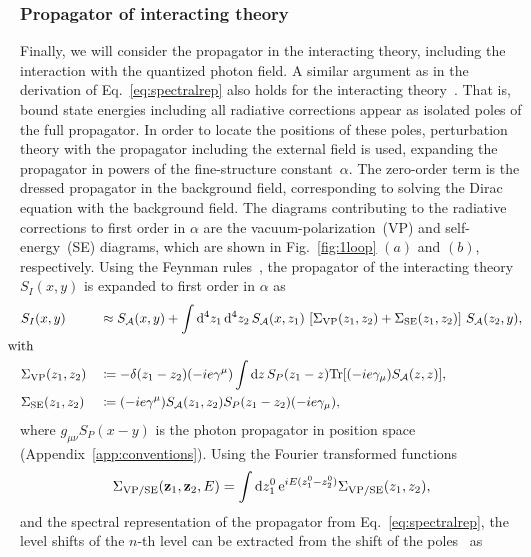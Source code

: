 \subsubsection*{Propagator of interacting theory}
Finally, we will consider the propagator in the interacting theory, including the interaction with the quantized photon field. A similar argument as in the derivation of Eq.~\eqref{eq:spectralrep} also holds for the interacting theory~\cite[Section 14.2.]{weinberg2005}. That is, bound state energies including all radiative corrections appear as isolated poles of the full propagator. In order to locate the positions of these poles, perturbation theory with the propagator including the external field is used, expanding the propagator in powers of the fine-structure constant~$\alpha$. The zero-order term is the dressed propagator in the background field, corresponding to solving the Dirac equation with the background field. The diagrams contributing to the radiative corrections to first order in $\alpha$ are the vacuum-polarization~(VP) and self-energy~(SE) diagrams, which are shown in Fig.~\ref{fig:1loop} $(a)$ and $(b)$, respectively. Using the Feynman rules~\mbox{\cite[Section 6.1.]{itzykson2005}}, the propagator of the interacting theory $S_{I}(x,y)$ is expanded to first order in $\alpha$ as
\begin{alignat}{2}
&S_{I}(x,y) &&\approx S_{\mathcal{A}}(x,y) + \int \mathrm{d}^4z_1\,\mathrm{d}^4z_2\,
S_{\mathcal{A}}(x,z_1)\,\left[\Sigma_{\text{VP}}(z_1,z_2)+\Sigma_{\text{SE}}(z_1,z_2)\right]\,S_{\mathcal{A}}(z_2,y),\notag\\
&\hspace{-0.35cm}\text{with }&&\notag\\
&\Sigma_{\text{VP}}(z_1,z_2)&&\coloneqq-\delta(z_1-z_2)(-ie\gamma^\mu)\int \text{d}z\,S_P(z_1-z)\Tr [(-ie\gamma_\mu)S_{\mathcal{A}}(z,z)],\notag\\
&\Sigma_{\text{SE}}(z_1,z_2)&&\coloneqq(-ie\gamma^\mu)S_{\mathcal{A}}(z_1,z_2)S_P(z_1-z_2)(-ie\gamma_\mu),
\end{alignat}
where $g_{\mu\nu}S_P(x-y)$ is the photon propagator in position space (Appendix~\ref{app:conventions}). Using the Fourier transformed functions
\begin{equation}
\Sigma_{\text{VP/SE}}(\mathbf{z}_1,\mathbf{z}_2,E)= \int \text{d}z_1^0\, \text{e}^{iE(z_1^0-z_2^0)}\Sigma_{\text{VP/SE}}(z_1,z_2),
\end{equation}
and the spectral representation of the propagator from Eq.~\eqref{eq:spectralrep}, the level shifts of the $n$-th level can be extracted from the shift of the poles~\mbox{\cite[Section 14.2.]{weinberg2005}} as
